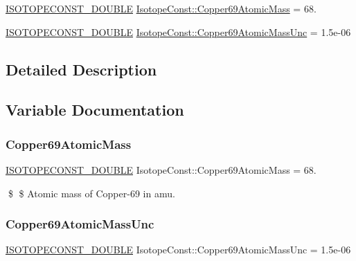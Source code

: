 \begin{DoxyCompactItemize}
\item 
\mbox{\hyperlink{group___isotope_const-_macros_ga8f45a7272ce02c0b4c65c44636ed719a}{I\+S\+O\+T\+O\+P\+E\+C\+O\+N\+S\+T\+\_\+\+D\+O\+U\+B\+LE}} \mbox{\hyperlink{group___isotope_const-_copper-_cu69_gaca822ecd3cfec16c89a57f4c207874c6}{Isotope\+Const\+::\+Copper69\+Atomic\+Mass}} = 68.
\item 
\mbox{\hyperlink{group___isotope_const-_macros_ga8f45a7272ce02c0b4c65c44636ed719a}{I\+S\+O\+T\+O\+P\+E\+C\+O\+N\+S\+T\+\_\+\+D\+O\+U\+B\+LE}} \mbox{\hyperlink{group___isotope_const-_copper-_cu69_gadd9da2cbd006d194476b84383695e0c7}{Isotope\+Const\+::\+Copper69\+Atomic\+Mass\+Unc}} = 1.\+5e-\/06
\end{DoxyCompactItemize}


\subsection{Detailed Description}


\subsection{Variable Documentation}
\mbox{\label{group___isotope_const-_copper-_cu69_gaca822ecd3cfec16c89a57f4c207874c6}} 
\subsubsection{\texorpdfstring{Copper69\+Atomic\+Mass}{Copper69AtomicMass}}
{\footnotesize\ttfamily \mbox{\hyperlink{group___isotope_const-_macros_ga8f45a7272ce02c0b4c65c44636ed719a}{I\+S\+O\+T\+O\+P\+E\+C\+O\+N\+S\+T\+\_\+\+D\+O\+U\+B\+LE}} Isotope\+Const\+::\+Copper69\+Atomic\+Mass = 68.}

\$ \$ Atomic mass of Copper-\/69 in amu. \mbox{\label{group___isotope_const-_copper-_cu69_gadd9da2cbd006d194476b84383695e0c7}} 
\subsubsection{\texorpdfstring{Copper69\+Atomic\+Mass\+Unc}{Copper69AtomicMassUnc}}
{\footnotesize\ttfamily \mbox{\hyperlink{group___isotope_const-_macros_ga8f45a7272ce02c0b4c65c44636ed719a}{I\+S\+O\+T\+O\+P\+E\+C\+O\+N\+S\+T\+\_\+\+D\+O\+U\+B\+LE}} Isotope\+Const\+::\+Copper69\+Atomic\+Mass\+Unc = 1.\+5e-\/06}

